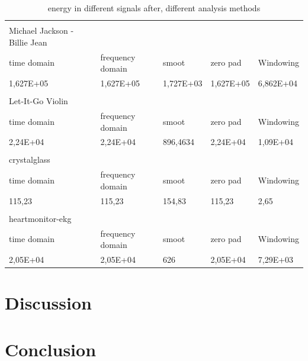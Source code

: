 \begin{table}[]
\begin{tabular}{lllll}
                              &                  &           &           &           \\
Michael Jackson - Billie Jean &                  &           &           &           \\
time domain                   & frequency domain & smoot     & zero pad  & Windowing \\
1,627E+05                     & 1,627E+05        & 1,727E+03 & 1,627E+05 & 6,862E+04 \\
                              &                  &           &           &           \\
Let-It-Go Violin              &                  &           &           &           \\
time domain                   & frequency domain & smoot     & zero pad  & Windowing \\
2,24E+04                      & 2,24E+04         & 896,4634  & 2,24E+04  & 1,09E+04  \\
                              &                  &           &           &           \\
crystalglass                  &                  &           &           &           \\
time domain                   & frequency domain & smoot     & zero pad  & Windowing \\
115,23                        & 115,23           & 154,83    & 115,23    & 2,65      \\
                              &                  &           &           &           \\
heartmonitor-ekg              &                  &           &           &           \\
time domain                   & frequency domain & smoot     & zero pad  & Windowing \\
2,05E+04                      & 2,05E+04         & 626       & 2,05E+04  & 7,29E+03 
\end{tabular}

\caption{energy in different signals after, different analysis methods }
\label{tab:Energy}
\end{table}

\section{Discussion}

\section{Conclusion}